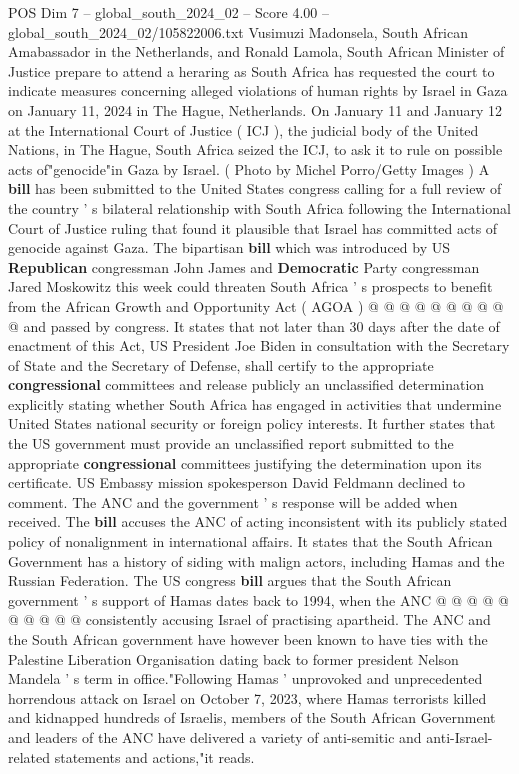 \begin{textsample}{POS Dim 7 – global\_south\_2024\_02 – Score 4.00 – global\_south\_2024\_02/105822006.txt}  \label{ex:f7_pos_205}
Vusimuzi Madonsela, South African Amabassador in the Netherlands, and Ronald Lamola, South African Minister of Justice prepare to attend a heraring as South Africa has requested the court to indicate measures concerning alleged violations of human rights by Israel in Gaza on January 11, 2024 in The Hague, Netherlands.
On January 11 and January 12 at the International Court of Justice ( ICJ ), the judicial body of the United Nations, in The Hague, South Africa seized the ICJ, to ask it to rule on possible acts of"genocide"in Gaza by Israel. ( Photo by Michel Porro/Getty Images ) A \textbf{bill} has been submitted to the United States congress calling for a full review of the country ' s bilateral relationship with South Africa following the International Court of Justice ruling that found it plausible that Israel has committed acts of genocide against Gaza.
The bipartisan \textbf{bill} which was introduced by US \textbf{Republican} congressman John James and \textbf{Democratic} Party congressman Jared Moskowitz this week could threaten South Africa ' s prospects to benefit from the African Growth and Opportunity Act ( AGOA ) @ @ @ @ @ @ @ @ @ @ and passed by congress.
It states that not later than 30 days after the date of enactment of this Act, US President Joe Biden in consultation with the Secretary of State and the Secretary of Defense, shall certify to the appropriate \textbf{congressional} committees and release publicly an unclassified determination explicitly stating whether South Africa has engaged in activities that undermine United States national security or foreign policy interests.
It further states that the US government must provide an unclassified report submitted to the appropriate \textbf{congressional} committees justifying the determination upon its certificate.
US Embassy mission spokesperson David Feldmann declined to comment.
The ANC and the government ' s response will be added when received.
The \textbf{bill} accuses the ANC of acting inconsistent with its publicly stated policy of nonalignment in international affairs.
It states that the South African Government has a history of siding with malign actors, including Hamas and the Russian Federation.
The US congress \textbf{bill} argues that the South African government ' s support of Hamas dates back to 1994, when the ANC @ @ @ @ @ @ @ @ @ @ consistently accusing Israel of practising apartheid.
The ANC and the South African government have however been known to have ties with the Palestine Liberation Organisation dating back to former president Nelson Mandela ' s term in office."Following Hamas ' unprovoked and unprecedented horrendous attack on Israel on October 7, 2023, where Hamas terrorists killed and kidnapped hundreds of Israelis, members of the South African Government and leaders of the ANC have delivered a variety of anti-semitic and anti-Israel-related statements and actions,"it reads.

\end{textsample}
